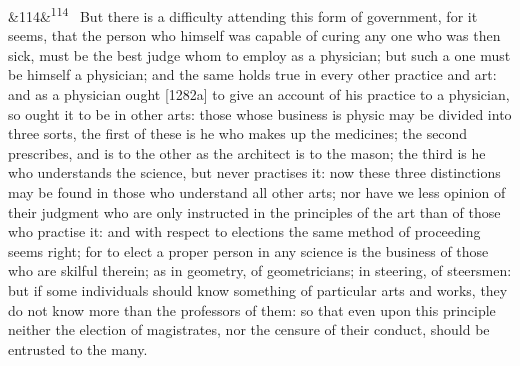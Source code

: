 \documentclass[12pt]{article}
\newcommand{\para}[1][]{\par\noindent\ifx&#1&\else\textsuperscript{\footnotesize #1}~\fi}
\begin{document}
\para[114] But there is a difficulty attending this form of government, for it seems, that the person who himself was capable of curing any one who was then sick, must be the best judge whom to employ as a physician; but such a one must be himself a physician; and the same holds true in every other practice and art: and as a physician ought [1282a] to give an account of his practice to a physician, so ought it to be in other arts: those whose business is physic may be divided into three sorts, the first of these is he who makes up the medicines; the second prescribes, and is to the other as the architect is to the mason; the third is he who understands the science, but never practises it: now these three distinctions may be found in those who understand all other arts; nor have we less opinion of their judgment who are only instructed in the principles of the art than of those who practise it: and with respect to elections the same method of proceeding seems right; for to elect a proper person in any science is the business of those who are skilful therein; as in geometry, of geometricians; in steering, of steersmen: but if some individuals should know something of particular arts and works, they do not know more than the professors of them: so that even upon this principle neither the election of magistrates, nor the censure of their conduct, should be entrusted to the many.
\end{document}
